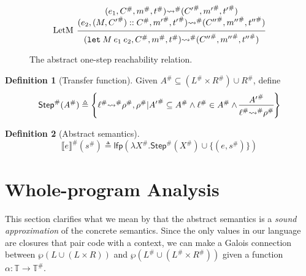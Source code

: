 \documentclass[acmsmall,review]{acmart}\settopmatter{printfolios=true,printccs=false,printacmref=false}
\theoremstyle{definition}
\newtheorem{definition}{Definition}[section]
\newcommand*{\cons}{::}
\newcommand*{\A}[1]{{#1}^{\#}}
\newcommand*{\Time}{\mathbb{T}}
\newcommand*{\ATime}{\A{\Time}}
\newcommand*{\mem}{m}
\newcommand*{\sembracket}[1]{\lBrack{#1}\rBrack}
\begin{document}
\begin{figure}[h!]
  \[
    \begin{prooftree}
      \hypo{
        \begin{matrix}
          (e_{1}, \A{C}, \A\mem, \A{t})
          \A\rightsquigarrow
          (\A{C'}, \A{\mem'}, \A{t'}) \\
          (e_{2}, (M, \A{C'})\cons \A{C}, \A{\mem'}, \A{t'})
          \A\rightsquigarrow
          (\A{C''}, \A{\mem''}, \A{t''})
        \end{matrix}
      }
      \infer[left label=LetM]1{
      (\mathtt{let}\:M\:e_{1}\:e_{2}, \A{C}, \A\mem, \A{t})
      \A\rightsquigarrow
      (\A{C''}, \A{\mem''}, \A{t''})
      }
    \end{prooftree}
  \]
  \caption{The abstract one-step reachability relation.}
  \label{fig:absreach}
\end{figure}

\begin{definition}[Transfer function]
  Given $\A{A}\subseteq (\A{L}\times \A{R})\cup\A{R}$, define
  \[
    \A{\mathsf{Step}}(\A{A})\triangleq
    \left\{\A\ell\A\rightsquigarrow\A\rho,\A\rho|
    \A{A'}\subseteq \A{A}\wedge\A{\ell}\in \A{A}\wedge
    \begin{prooftree}[center=true]
      \hypo{\A{A'}}\infer1{\A\ell\A\rightsquigarrow\A\rho}
    \end{prooftree}\right\}
  \]
\end{definition}
\begin{definition}[Abstract semantics]
  \[
    \A{\sembracket{e}}(\A{s})\triangleq\mathsf{lfp}(\lambda \A{X}.\A{\mathsf{Step}}(\A{X})\cup\{(e,\A{s})\})
  \]
\end{definition}

\section{Whole-program Analysis}
This section clarifies what we mean by that the abstract semantics is a \emph{sound approximation} of the concrete semantics.
Since the only values in our language are closures that pair code with a context, we can make a Galois connection between $\wp(L\cup(L\times R))$ and $\wp(\A{L}\cup(\A{L}\times\A{R}))$ given a function $\alpha:\Time\rightarrow\ATime$.
\end{document}
